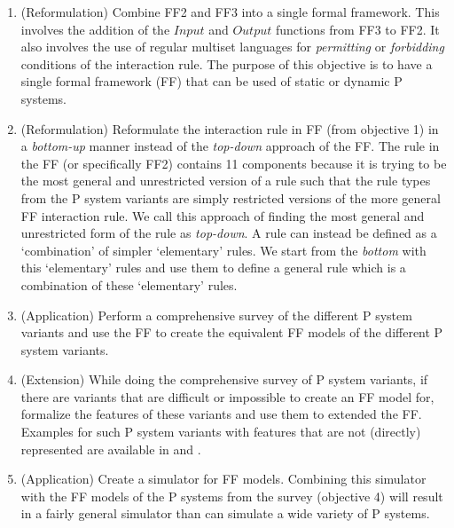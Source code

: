 \documentclass{article}
\begin{document}
\begin{enumerate}
   \item (Reformulation) Combine FF2 and FF3 into a single formal framework. This involves the 
         addition of the $Input$ and $Output$ functions from FF3 to FF2. It also involves the use of
         regular multiset languages for \emph{permitting} or \emph{forbidding} conditions of the 
         interaction rule. The purpose of this objective is to have a single formal framework (FF) 
         that can be used of static or dynamic P systems.
   \item (Reformulation) Reformulate the interaction rule in FF (from objective 1) in a 
         \emph{bottom-up} manner instead of the \emph{top-down} approach of the FF. The rule in the
         FF (or specifically FF2) contains 11 components because it is trying to be the most general
         and unrestricted version of a rule such that the rule types from the P system variants are 
         simply restricted versions of the more general FF interaction rule. We call this approach 
         of finding the most general and unrestricted form of the rule as \emph{top-down}. A rule 
         can instead be defined as a `combination' of simpler `elementary' rules. We start from the
         \emph{bottom} with this `elementary' rules and use them to define a general rule which is
         a combination of these `elementary' rules. 
   \item (Application) Perform a comprehensive survey of the different P system variants and use the
         FF to create the equivalent FF models of the different P system variants.
   \item (Extension) While doing the comprehensive survey of P system variants, if there are 
         variants that are difficult or impossible to create an FF model for, formalize the features
         of these variants and use them to extended the FF. Examples for such P system variants with
         features that are not (directly) represented are available in \cite{polymorphic} and 
         \cite{rule-create}.
   \item (Application) Create a simulator for FF models. Combining this simulator with the FF models
        of the P systems from the survey (objective 4) will result in a fairly general simulator 
        than can simulate a wide variety of P systems.
\end{enumerate}

\end{document}
